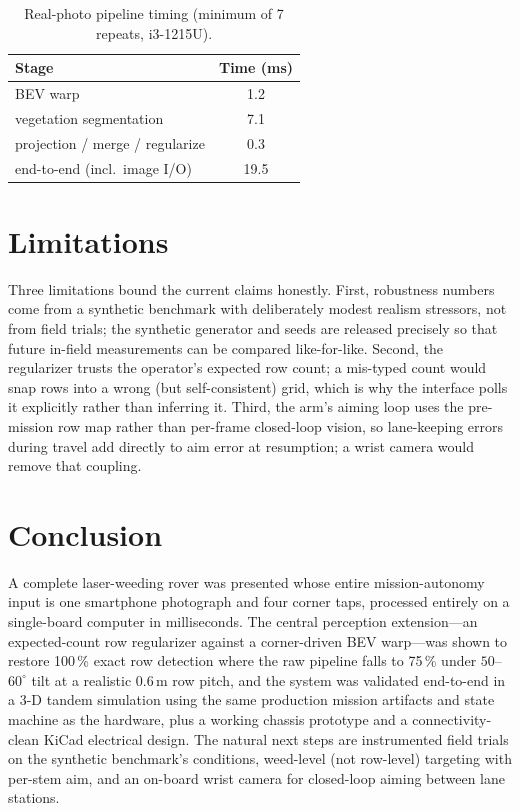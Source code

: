 \documentclass[conference]{IEEEtran}
\begin{document}
\begin{table}[t]
\caption{Real-photo pipeline timing (minimum of 7 repeats, i3-1215U).}
\label{tab:timing}
\centering
\begin{tabular}{@{}lc@{}}
\hline
Stage & Time (ms)\\
\hline
BEV warp & 1.2\\
vegetation segmentation & 7.1\\
projection / merge / regularize & 0.3\\
end-to-end (incl.\ image I/O) & 19.5\\
\hline
\end{tabular}
\end{table}

\section{Limitations}
Three limitations bound the current claims honestly. First, robustness
numbers come from a synthetic benchmark with deliberately modest realism
stressors, not from field trials; the synthetic generator and seeds are
released precisely so that future in-field measurements can be compared
like-for-like. Second, the regularizer trusts the operator's expected row
count; a mis-typed count would snap rows into a wrong (but self-consistent)
grid, which is why the interface polls it explicitly rather than inferring
it. Third, the arm's aiming loop uses the pre-mission row map rather than
per-frame closed-loop vision, so lane-keeping errors during travel add
directly to aim error at resumption; a wrist camera would remove that
coupling.

\section{Conclusion}\label{sec:conclusion}
A complete laser-weeding rover was presented whose entire mission-autonomy
input is one smartphone photograph and four corner taps, processed entirely
on a single-board computer in milliseconds. The central perception
extension---an expected-count row regularizer against a corner-driven BEV
warp---was shown to restore 100\,\% exact row detection where the raw
pipeline falls to 75\,\% under $50$--$60^\circ$ tilt at a realistic 0.6\,m
row pitch, and the system was validated end-to-end in a 3-D tandem
simulation using the same production mission artifacts and state machine as
the hardware, plus a working chassis prototype and a connectivity-clean
KiCad electrical design. The natural next steps are instrumented field
trials on the synthetic benchmark's conditions, weed-level (not row-level)
targeting with per-stem aim, and an on-board wrist camera for closed-loop
aiming between lane stations.
\end{document}
